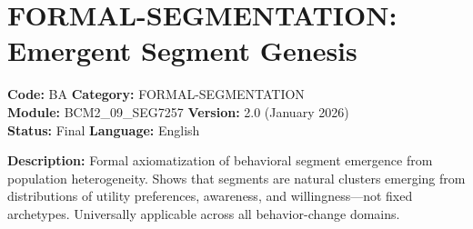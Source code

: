 %
%
%
%
%

\chapter{FORMAL-SEGMENTATION: Emergent Segment Genesis}
\label{app:formal-segmentation}
\label{app:ba-segments}


\begin{tcolorbox}[colback=gray!5!white, colframe=gray!75!black,
    title=Appendix PAP1: Header Block]

\noindent
\textbf{Code:} BA \quad \textbf{Category:} FORMAL-SEGMENTATION \\
\textbf{Module:} BCM2\_09\_SEG7257 \quad \textbf{Version:} 2.0 (January 2026) \\
\textbf{Status:} Final \quad \textbf{Language:} English

\vspace{0.5em}

\noindent
\textbf{Description:}
Formal axiomatization of behavioral segment emergence from population heterogeneity. Shows that segments are natural clusters emerging from distributions of utility preferences, awareness, and willingness—not fixed archetypes. Universally applicable across all behavior-change domains.

\end{tcolorbox}

